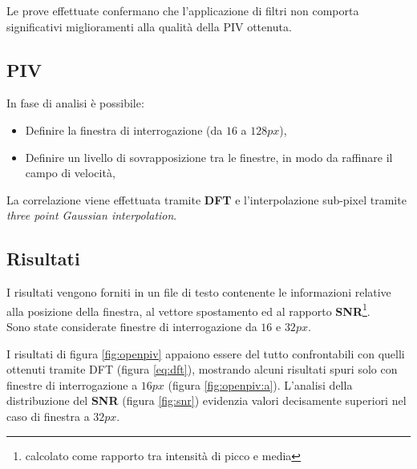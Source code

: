 \documentclass[a4paper]{article}
\begin{document}
Le prove effettuate confermano che l'applicazione di filtri non comporta significativi miglioramenti alla qualità della PIV ottenuta.

\subsection{PIV}

In fase di analisi è possibile:

\begin{itemize}
	\item Definire la finestra di interrogazione (da $16$ a $128px$),
	\item Definire un livello di sovrapposizione tra le finestre, in modo da raffinare il campo di velocità,
\end{itemize}

La correlazione viene effettuata tramite \textbf{DFT} e l'interpolazione sub-pixel tramite \textit{three point Gaussian interpolation}.

\subsection{Risultati}

I risultati vengono forniti in un file di testo contenente le informazioni relative alla posizione della finestra, al vettore spostamento ed al rapporto \textbf{SNR}\footnote{calcolato come rapporto tra intensità di picco e media}.\\
Sono state considerate finestre di interrogazione da $16$ e $32px$.

I risultati di figura \ref{fig:openpiv} appaiono essere del tutto confrontabili con quelli ottenuti tramite DFT (figura \ref{eq:dft}), mostrando alcuni risultati spuri solo con finestre di interrogazione a $16px$ (figura \ref{fig:openpiv:a}). L'analisi della distribuzione del \textbf{SNR} (figura \ref{fig:snr}) evidenzia valori decisamente superiori nel caso di finestra a $32px$. 
\end{document}
